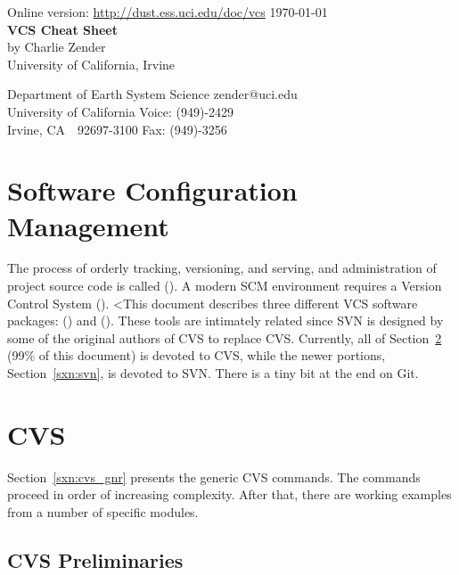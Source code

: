 \documentclass[12pt,twoside]{article}
\begin{document}
\begin{center}
Online version: \url{http://dust.ess.uci.edu/doc/vcs} \hfill \today\\
\bigskip
\bigskip
{\Large \textbf{VCS Cheat Sheet}}\\
\bigskip
by Charlie Zender\\
University of California, Irvine\\
\end{center}
Department of Earth System Science \hfill zender@uci.edu\\
University of California \hfill Voice: (949)-2429\\
Irvine, CA~~92697-3100 \hfill Fax: (949)-3256

\setcounter{page}{1}
\pagestyle{headings}
\thispagestyle{empty}
\tableofcontents
{}
\setcounter{page}{1}
\thispagestyle{empty}

\section{Software Configuration Management}
The process of orderly tracking, versioning, and serving, and
administration of project source code is called
 ().
A modern SCM environment requires a Version Control System ().
<This document describes three different VCS software packages:
\href{http://www.cvshome.org}{}
() and 
\href{http://subversion.tigris.org}{} ().
These tools are intimately related since SVN is designed by some of
the original authors of CVS to replace CVS.
Currently, all of Section~\ref{sxn:cvs} (99\% of this document)
is devoted to CVS, while the newer portions, Section~\ref{sxn:svn},
is devoted to SVN. There is a tiny bit at the end on Git.

\section{CVS}\label{sxn:cvs}

Section~\ref{sxn:cvs_gnr} presents the generic CVS commands.
The commands proceed in order of increasing complexity. 
After that, there are working examples from a number of specific
modules.  

\subsection{CVS Preliminaries}\label{sxn:cvs_prl}
\end{document}
